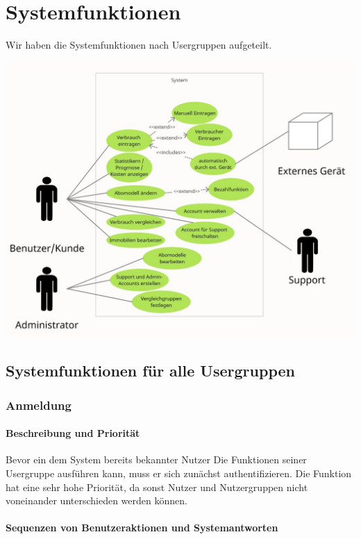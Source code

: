 \section{Systemfunktionen}
\label{system_features}

Wir haben die Systemfunktionen nach Usergruppen aufgeteilt. 

\includegraphics[scale=0.5]{UC.jpg}

\subsection{Systemfunktionen für alle Usergruppen}
\subsubsection{Anmeldung}
\paragraph{Beschreibung und Priorität}

Bevor ein dem System bereits bekannter Nutzer Die Funktionen seiner Usergruppe ausführen kann, muss er sich zunächst authentifizieren. Die Funktion hat eine sehr hohe Priorität, da sonst Nutzer und Nutzergruppen nicht voneinander unterschieden werden können.

\paragraph{Sequenzen von Benutzeraktionen und Systemantworten}

